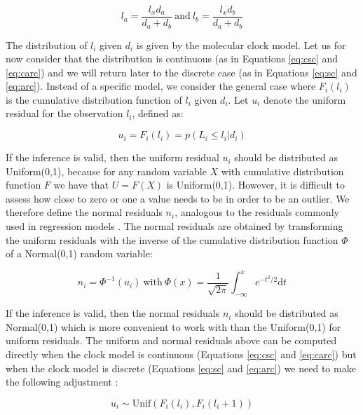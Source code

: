 \documentclass{article}
\begin{document}
\begin{equation}
l_a = \frac{l_x d_a}{d_a+d_b}\mathrm{~and~}l_b = \frac{l_x d_b}{d_a+d_b}
\end{equation}

The distribution of $l_i$ given $d_i$ is given by the molecular clock model. 
Let us for now consider that the distribution
is continuous (as in Equations \ref{eq:csc} and \ref{eq:carc}) and we will return later to the discrete case 
(as in Equations \ref{eq:sc} and \ref{eq:arc}). 
Instead of a specific model, we consider the general case where
$F_i(l_i)$ is the cumulative distribution function of $l_i$ given $d_i$.
Let $u_i$ denote the uniform residual for the observation $l_i$, defined as:

\begin{equation}
u_i=F_i(l_i)=p(L_i\leq l_i|d_i)
\label{eq:unif-resid}
\end{equation}

If the inference is valid, then the uniform residual $u_i$ 
should be distributed as Uniform(0,1), because for any random variable $X$ with cumulative distribution function $F$ we have that $U=F(X)$ is Uniform(0,1). 
However, it is difficult to assess how close to zero or one a value needs to be in order to be 
an outlier. 
We therefore define the normal residuals $n_i$, analogous to the residuals commonly used in 
regression models \citep{coxGeneralDefinitionResiduals1968,dunnRandomizedQuantileResiduals1996}. 
The normal residuals are obtained 
by transforming the uniform residuals with the inverse of the cumulative distribution function $\Phi$ 
of a Normal(0,1) random variable:

\begin{equation}
n_i=\Phi^{-1}(u_i)\mathrm{~with~}\Phi(x)=\frac{1}{\sqrt{2\pi}}\int_{-\infty}^x e^{-t^2/2}\mathrm{d}t
\label{eq:norm-resid}
\end{equation}

If the inference is valid, then the normal residuals $n_i$ should be distributed
as Normal(0,1) which is more convenient to work with than the Uniform(0,1) for uniform residuals.
The uniform and normal residuals above can be computed directly
when the clock model is continuous (Equations \ref{eq:csc} and \ref{eq:carc}) but when
the clock model is discrete (Equations \ref{eq:sc} and \ref{eq:arc}) we need to make the following
adjustment \citep{dunnRandomizedQuantileResiduals1996,brockwellUniversalResidualsMultivariate2007,lauNewModelDiagnostics2014}:

\begin{equation}
u_i \sim \mathrm{Unif}(F_i(l_i),F_i(l_i+1))
\label{eq:unif-resid-discrete}
\end{equation}
\end{document}
